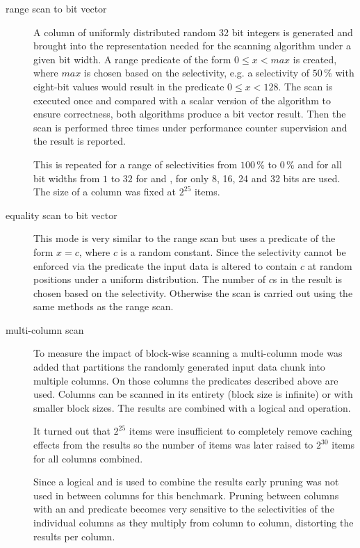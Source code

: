 \begin{description}
\item[range scan to bit vector]
  A column of uniformly distributed random 32 bit integers is generated and
  brought into the representation needed for the scanning algorithm under a
  given bit width. A range predicate of the form $0 \le x < max$ is created,
  where $max$ is chosen based on the selectivity, e.g.  a selectivity of
  $50\,\%$ with eight-bit values would result in the predicate $0 \le x < 128$.
  The scan is executed once and compared with a scalar version of the algorithm
  to ensure correctness, both algorithms produce a bit vector result. Then the
  scan is performed three times under performance counter supervision and the
  result is reported.

  This is repeated for a range of selectivities from $100\,\%$ to $0\,\%$ and
  for all bit widths from $1$ to $32$ for \simdscan{} and \bwv{}, for \bs{} only
  8, 16, 24 and 32 bits are used. The size of a column was fixed at $2^{25}$
  items.

\item[equality scan to bit vector]
  This mode is very similar to the range scan but uses a predicate of the form
  $x = c$, where $c$ is a random constant. Since the selectivity cannot be
  enforced via the predicate the input data is altered to contain $c$ at random
  positions under a uniform distribution. The number of $c$s in the result is
  chosen based on the selectivity. Otherwise the scan is carried out using the
  same methods as the range scan.

\item[multi-column scan]
  To measure the impact of block-wise scanning a multi-column mode was added
  that partitions the randomly generated input data chunk into multiple
  columns. On those columns the predicates described above are used. Columns
  can be scanned in its entirety (block size is infinite) or with smaller
  block sizes. The results are combined with a logical and operation.

  It turned out that $2^{25}$ items were insufficient to completely remove
  caching effects from the results so the number of items was later raised to
  $2^{30}$ items for all columns combined.

  Since a logical and is used to combine the results early pruning was not used
  in between columns for this benchmark. Pruning between columns with an and
  predicate becomes very sensitive to the selectivities of the individual
  columns as they multiply from column to column, distorting the results per
  column.


\end{description}
